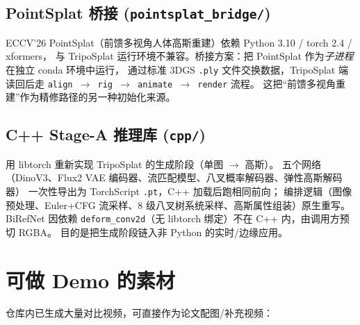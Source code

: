 \documentclass[11pt]{article}
\begin{document}
\subsection{PointSplat 桥接 (\texttt{pointsplat\_bridge/})}
ECCV'26 PointSplat（前馈多视角人体高斯重建）依赖 Python 3.10 / torch 2.4 / xformers，
与 TripoSplat 运行环境不兼容。桥接方案：把 PointSplat 作为\emph{子进程}在独立 conda 环境中运行，
通过标准 3DGS \texttt{.ply} 文件交换数据，TripoSplat 端读回后走 \texttt{align $\rightarrow$ rig $\rightarrow$ animate $\rightarrow$ render} 流程。
这把``前馈多视角重建''作为精修路径的另一种初始化来源。

\subsection{C++ Stage-A 推理库 (\texttt{cpp/})}
用 libtorch 重新实现 TripoSplat 的生成阶段（单图 $\rightarrow$ 高斯）。
五个网络（DinoV3、Flux2 VAE 编码器、流匹配模型、八叉概率解码器、弹性高斯解码器）
一次性导出为 TorchScript \texttt{.pt}，C++ 加载后跑相同前向；
编排逻辑（图像预处理、Euler+CFG 流采样、8 级八叉树系统采样、高斯属性组装）原生重写。
BiRefNet 因依赖 \texttt{deform\_conv2d}（无 libtorch 绑定）不在 C++ 内，由调用方预切 RGBA。
目的是把生成阶段链入非 Python 的实时/边缘应用。

\section{可做 Demo 的素材}

仓库内已生成大量对比视频，可直接作为论文配图/补充视频：
\end{document}

